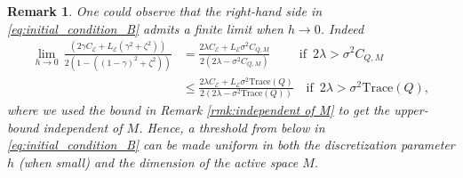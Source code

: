 \documentclass[12pt]{amsart}
\numberwithin{equation}{section}
\newtheorem{remark}[theorem]{Remark}
\begin{document}
\begin{remark}
One could observe that the right-hand side in \eqref{eq:initial_condition_B} admits a finite limit when $h\to 0$. Indeed
\begin{equation*}
\begin{aligned}
    \lim\limits_{h\to 0}\, \frac{ \left( 2\gamma C_{\mathscr{E}} + L_\mathscr{E}(\gamma^2 + \zeta^2) \right) }{2(1 - ((1-\gamma)^2 + \zeta^2))} 
    & = \frac{2\lambda C_{\mathscr{E}} + L_{\mathscr{E}}\sigma^2 C_{Q,M} }{2(2\lambda - \sigma^2 C_{Q,M})}\qquad \text{ if }\, 2\lambda > \sigma^2 C_{Q,M}\\
    & \leq \frac{2\lambda C_{\mathscr{E}} + L_{\mathscr{E}}\sigma^2 \mathrm{Trace}(Q) }{2(2\lambda - \sigma^2 \mathrm{Trace}(Q))}\quad \text{if }\, 2\lambda > \sigma^2 \mathrm{Trace}(Q),
\end{aligned}
\end{equation*}
where we used the bound in Remark \ref{rmk:independent of M} to get the upper-bound independent of $M$. Hence, a threshold from below in \eqref{eq:initial_condition_B} can be made uniform in both the discretization parameter $h$ (when small) and the dimension of the active space $M$.  
\end{remark}
\end{document}
